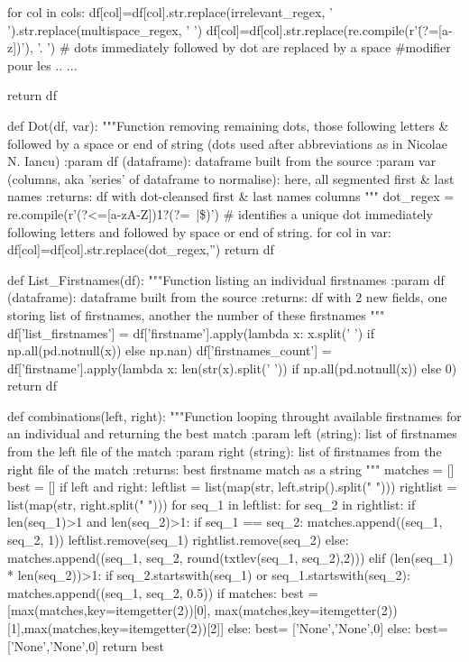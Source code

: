 \documentclass[a4paper,12pt,twoside]{book}
\begin{document}
\begin{python}
  for col in cols:
    df[col]=df[col].str.replace(irrelevant_regex, ' ').str.replace(multispace_regex, ' ')
    df[col]=df[col].str.replace(re.compile(r'\.(?=[a-z])'), '. ') # dots immediately followed by dot are replaced by a space  #modifier pour les .. ...
    
  return df

def Dot(df, var):
  """Function removing remaining dots, those following letters & followed by a space or end of string (dots used after abbreviations as in Nicolae N. Iancu)
    :param df (dataframe): dataframe built from the source
    :param var (columns, aka 'series' of dataframe to normalise): here, all segmented first & last names
    :returns: df with dot-cleansed first & last names columns
  """
  dot_regex = re.compile(r'(?<=[a-zA-Z])\.{1}?(?=\ |\$)') # identifies a unique dot immediately following letters and followed by space or end of string.
  for col in var:
    df[col]=df[col].str.replace(dot_regex,'')
  return df


def List_Firstnames(df):
  """Function listing an individual firstnames
    :param df (dataframe): dataframe built from the source
    :returns: df with 2 new fields, one storing list of firstnames, another the number of these firstnames
  """
  df['list_firstnames'] = df['firstname'].apply(lambda x: x.split(' ') if np.all(pd.notnull(x)) else np.nan)
  df['firstnames_count'] = df['firstname'].apply(lambda x: len(str(x).split(' ')) if np.all(pd.notnull(x)) else 0)
  return df

def combinations(left, right):
  """Function looping throught available firstnames for an individual and returning the best match
    :param left (string): list of firstnames from the left file of the match
    :param right (string): list of firstnames from the right file of the match
    :returns: best firstname match as a string
  """
  matches = []
  best = []
  if left and right:
    leftlist = list(map(str, left.strip().split(" ")))
    rightlist = list(map(str, right.split(" ")))
    for seq_1 in leftlist:
      for seq_2 in rightlist:
        if len(seq_1)>1 and len(seq_2)>1:
          if seq_1 == seq_2:
            matches.append((seq_1, seq_2, 1))
            leftlist.remove(seq_1)
            rightlist.remove(seq_2)
          else: 
            matches.append((seq_1, seq_2, round(txtlev(seq_1, seq_2),2)))
        elif (len(seq_1) * len(seq_2))>1:
          if seq_2.startswith(seq_1) or seq_1.startswith(seq_2):
            matches.append((seq_1, seq_2, 0.5))
    if matches:
      best = [max(matches,key=itemgetter(2))[0], max(matches,key=itemgetter(2))[1],max(matches,key=itemgetter(2))[2]]
    else:
      best= ['None','None',0]
  else:
    best= ['None','None',0]
  return best



\end{python}
\end{document}
